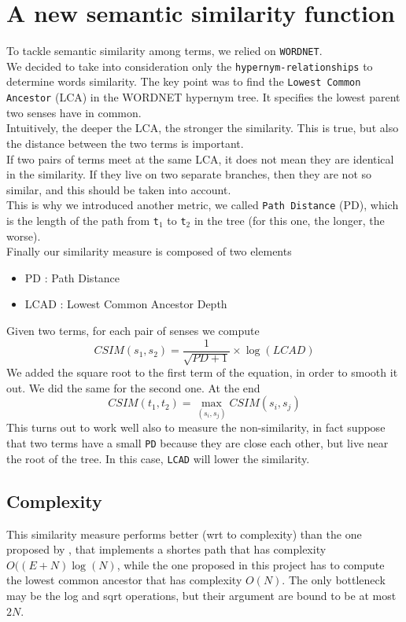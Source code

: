 \documentclass[letterpaper, 10 pt, conference]{ieeeconf}  %
\begin{document}
\section{A new semantic similarity function}
To tackle semantic similarity among terms, we relied on \texttt{WORDNET}.\\
We decided to take into consideration only the \texttt{hypernym-relationships} to determine words similarity. The key point was to find the \texttt{Lowest Common Ancestor} (LCA) in the WORDNET hypernym tree. It specifies the lowest parent two senses have in common.\\
Intuitively, the deeper the LCA, the stronger the similarity. This is true, but also the distance between the two terms is important.\\
If two pairs of terms meet at the same LCA, it does not mean they are identical in the similarity. If they live on two separate branches, then they are not so similar, and this should be taken into account.\\
This is why we introduced another metric, we called \texttt{Path Distance} (PD), which is the length of the path from \texttt{t$_1$} to \texttt{t$_2$} in the tree (for this one, the longer, the worse).\\
Finally our similarity measure is composed of two elements
\begin{itemize}
\item PD : Path Distance
\item LCAD : Lowest Common Ancestor Depth
\end{itemize}
Given two terms, for each pair of senses we compute
\begin{equation}
CSIM(s_1,s_2) = \frac{1}{\sqrt{PD+1}} \times \log(LCAD)
\end{equation}
We added the square root to the first term of the equation, in order to smooth it out. We did the same for the second one.
At the end
\begin{equation}
CSIM(t_1,t_2) = \max_{(s_i,s_j)} CSIM(s_i,s_j)
\end{equation}
This turns out to work well also to measure the non-similarity, in fact suppose that two terms have a small \texttt{PD} because they are close each other, but live near the root of the tree. In this case, \texttt{LCAD} will lower the similarity.\\
\subsection{Complexity}
This similarity measure performs better (wrt to complexity) than the one proposed by \cite{c1}, that implements a shortes path that has complexity $O((E+N)\log(N)$, while the one proposed in this project has to compute the lowest common ancestor that has complexity $O(N)$. The only bottleneck may be the log and sqrt operations, but their argument are bound to be at most $2N$.
\clearpage
\end{document}
